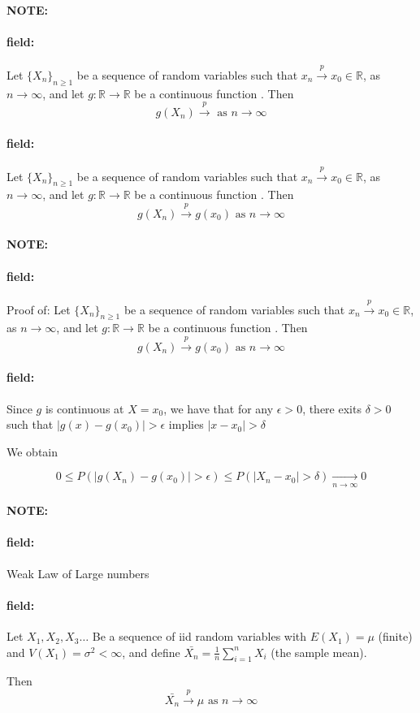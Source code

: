 \documentclass[12pt]{article}
\newenvironment{note}{\paragraph{NOTE:}}{}
\newenvironment{field}{\paragraph{field:}}{}
\begin{document}
\begin{note}
  \begin{field}
    Let $\{X_n\}_{n \geq 1}$ be a sequence of random variables such that $x_n \overset{p}{\to} x_0 \in \mathbb{R}$, as $n \to \infty$, and let $g: \mathbb{R} \to \mathbb{R}$ be a continuous function . Then $$g(X_n) \overset{p}{\to}  \text{ as } n \to \infty$$
  \end{field}
  \begin{field}
    Let $\{X_n\}_{n \geq 1}$ be a sequence of random variables such that $x_n \overset{p}{\to} x_0 \in \mathbb{R}$, as $n \to \infty$, and let $g: \mathbb{R} \to \mathbb{R}$ be a continuous function . Then $$g(X_n) \overset{p}{\to} g(x_0) \text{ as } n \to \infty$$
  \end{field}
\end{note}


\begin{note}
  \begin{field}
    Proof of: Let $\{X_n\}_{n \geq 1}$ be a sequence of random variables such that $x_n \overset{p}{\to} x_0 \in \mathbb{R}$, as $n \to \infty$, and let $g: \mathbb{R} \to \mathbb{R}$ be a continuous function . Then $$g(X_n) \overset{p}{\to} g(x_0) \text{ as } n \to \infty$$
  \end{field}
  \begin{field}
    Since $g$ is continuous at $X = x_0$, we have that for any $\epsilon > 0$, there exits $\delta > 0$ such that $|g(x) - g(x_0)| > \epsilon $ implies $|x - x_0| > \delta $

    We obtain

    $$0 \leq P(|g(X_n) - g(x_0)| > \epsilon ) \leq P(|X_n - x_0| > \delta) \underset{n \to \infty}{\to} 0$$
  \end{field}
\end{note}


\begin{note}
  \begin{field}
    Weak Law of Large numbers
  \end{field}
  \begin{field}
    Let $X_1, X_2, X_3 \ldots$ Be a sequence of iid random variables with $E(X_1) = \mu$ (finite) and $V(X_1) = \sigma^2 < \infty$, and define $\bar{X_n} = \frac{1}{n} \sum_{i = 1}^n X_i$ (the sample mean).

    Then $$ \bar{X_n }\overset{p}{\to}\mu \text{ as } n \to \infty$$

  \end{field}
\end{note}
\end{document}
